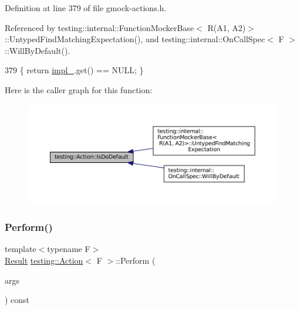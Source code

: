Definition at line 379 of file gmock-\/actions.\+h.



Referenced by testing\+::internal\+::\+Function\+Mocker\+Base$<$ R(\+A1, A2)$>$\+::\+Untyped\+Find\+Matching\+Expectation(), and testing\+::internal\+::\+On\+Call\+Spec$<$ F $>$\+::\+Will\+By\+Default().


\begin{DoxyCode}
379 \{ \textcolor{keywordflow}{return} \hyperlink{classtesting_1_1Action_a878cb86f5126a22b5c6d5d8fb919f5d9}{impl\_}.get() == NULL; \}
\end{DoxyCode}
Here is the caller graph for this function\+:
\nopagebreak
\begin{figure}[H]
\begin{center}
\leavevmode
\includegraphics[width=350pt]{classtesting_1_1Action_a4468ca2ea5e9f7363271145992d09dba_icgraph}
\end{center}
\end{figure}
\mbox{\label{classtesting_1_1Action_ad00a03062885685da84b308e6e8ff4cb}} 
\subsubsection{\texorpdfstring{Perform()}{Perform()}}
{\footnotesize\ttfamily template$<$typename F$>$ \\
\hyperlink{classtesting_1_1Action_a9af08a21ad329331fde856cba9b6dea2}{Result} \hyperlink{classtesting_1_1Action}{testing\+::\+Action}$<$ F $>$\+::Perform (\begin{DoxyParamCaption}\item[{const \hyperlink{classtesting_1_1Action_ae27fda510696a9294f991de5b1abfaf2}{Argument\+Tuple} \&}]{args }\end{DoxyParamCaption}) const\hspace{0.3cm}{\ttfamily [inline]}}



